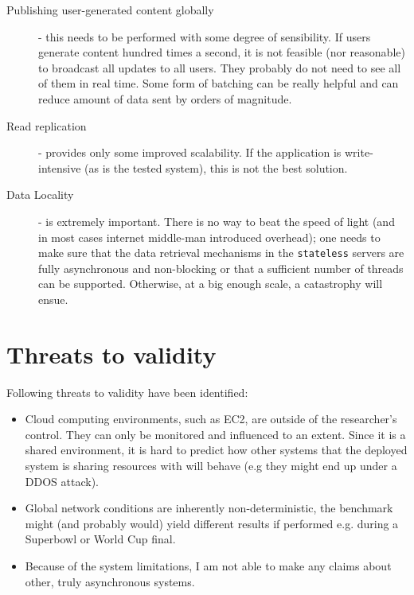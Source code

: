 \documentclass{uvamscse}
\begin{document}
\begin{description}
  \item[Publishing user-generated content globally] - this needs to be performed with some degree of sensibility. If users generate content hundred times a second, it is not feasible (nor reasonable) to broadcast all updates to all users. They probably do not need to see all of them in real time. Some form of batching can be really helpful and can reduce amount of data sent by orders of magnitude.
  \item[Read replication] - provides only some improved scalability. If the application is write-intensive (as is the tested system), this is not the best solution.
  \item[Data Locality] - is extremely important. There is no way to beat the speed of light (and in most cases internet middle-man introduced overhead); one needs to make sure that the data retrieval mechanisms in the \texttt{stateless} servers are fully asynchronous and non-blocking or that a sufficient number of threads can be supported. Otherwise, at a big enough scale, a catastrophy will ensue.
\end{description}


\section{Threats to validity}
Following threats to validity have been identified:
\begin{itemize}
  \item Cloud computing environments, such as EC2, are outside of the researcher's control. They can only be monitored and influenced to an extent. Since it is a shared environment, it is hard to predict how other systems that the deployed system is sharing resources with will behave (e.g they might end up under a DDOS attack).
  \item Global network conditions are inherently non-deterministic, the benchmark might (and probably would) yield different results if performed e.g. during a Superbowl or World Cup final.
  \item Because of the system limitations, I am not able to make any claims about other, truly asynchronous systems.
\end{itemize}
\end{document}
